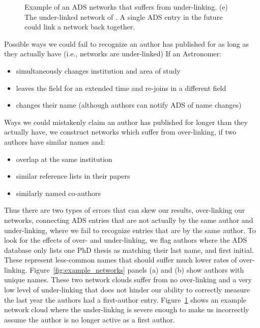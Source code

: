 \documentclass[preprint2]{aastex}
\begin{document}
\begin{figure}
  \caption{Example of an ADS networks that suffers from under-linking.  (e) The under-linked network of \citet{Capelo12}.  A single ADS entry in the future could link a network back together. \label{fig:underlinked}}
\end{figure}


Possible ways we could fail to recognize an author has published for as long as they actually have (i.e., networks are under-linked) If an Astronomer:
\begin{itemize}
\item{simultaneously changes institution and area of study}
\item{leaves the field for an extended time and re-joins in a different field}
\item{changes their name (although authors can notify ADS of name changes)}
\end{itemize}

Ways we could mistakenly claim an author has published for longer than they actually have, we construct networks which suffer from over-linking, if two authors have similar names and:
\begin{itemize}
\item{overlap at the same institution}
\item{similar reference lists in their papers}
  \item{similarly named co-authors}
\end{itemize}

Thus there are two types of errors that can skew our results, over-linking our networks, connecting ADS entries that are not actually by the same author and under-linking, where we fail to recognize entries that are by the same author.  To look for the effects of over- and under-linking, we flag authors where the ADS database only lists one PhD thesis as matching their last name, and first initial. These represent less-common names that should suffer much lower rates of over-linking. Figure~\ref{fig:example_networks} panels (a) and (b) show authors with unique names. These two network clouds suffer from no over-linking and a very low level of under-linking that does not hinder our ability to correctly measure the last year the authors had a first-author entry.  Figure~\ref{fig:underlinked} shows an example network cloud where the under-linking is severe enough to make us incorrectly assume the author is no longer active as a first author.
\end{document}
